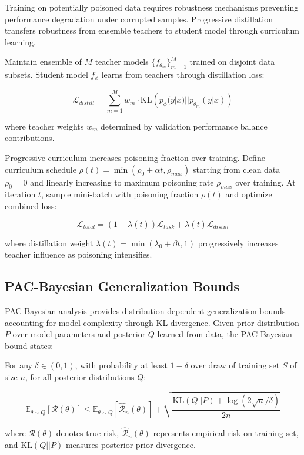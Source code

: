 Training on potentially poisoned data requires robustness mechanisms preventing performance degradation under corrupted samples. Progressive distillation transfers robustness from ensemble teachers to student model through curriculum learning.

Maintain ensemble of $M$ teacher models $\{f_{\theta_m}\}_{m=1}^M$ trained on disjoint data subsets. Student model $f_\phi$ learns from teachers through distillation loss:

\begin{equation}
\mathcal{L}_{distill} = \sum_{m=1}^M w_m \cdot \text{KL}\left(p_\phi(y|x) || p_{\theta_m}(y|x)\right)
\end{equation}

where teacher weights $w_m$ determined by validation performance balance contributions.

Progressive curriculum increases poisoning fraction over training. Define curriculum schedule $\rho(t) = \min(\rho_0 + \alpha t, \rho_{max})$ starting from clean data $\rho_0 = 0$ and linearly increasing to maximum poisoning rate $\rho_{max}$ over training. At iteration $t$, sample mini-batch with poisoning fraction $\rho(t)$ and optimize combined loss:

\begin{equation}
\mathcal{L}_{total} = (1-\lambda(t))\mathcal{L}_{task} + \lambda(t)\mathcal{L}_{distill}
\end{equation}

where distillation weight $\lambda(t) = \min(\lambda_0 + \beta t, 1)$ progressively increases teacher influence as poisoning intensifies.

\subsection{PAC-Bayesian Generalization Bounds}

PAC-Bayesian analysis provides distribution-dependent generalization bounds accounting for model complexity through KL divergence. Given prior distribution $P$ over model parameters and posterior $Q$ learned from data, the PAC-Bayesian bound states:

\begin{theorem}
\label{thm:pacbayes_ssm}
For any $\delta \in (0,1)$, with probability at least $1-\delta$ over draw of training set $S$ of size $n$, for all posterior distributions $Q$:

\begin{equation}
\mathbb{E}_{\theta \sim Q}[\mathcal{R}(\theta)] \leq \mathbb{E}_{\theta \sim Q}[\hat{\mathcal{R}}_n(\theta)] + \sqrt{\frac{\text{KL}(Q||P) + \log(2\sqrt{n}/\delta)}{2n}}
\end{equation}

where $\mathcal{R}(\theta)$ denotes true risk, $\hat{\mathcal{R}}_n(\theta)$ represents empirical risk on training set, and $\text{KL}(Q||P)$ measures posterior-prior divergence.
\end{theorem}


